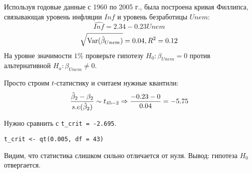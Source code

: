 \begin{problem}
Используя годовые данные с 1960 по 2005 г., была построена кривая Филлипса, связывающая уровень инфляции $Inf$ и уровень безработицы $Unem$:
\[
\widehat{Inf} = 2.34 - 0.23Unem
\]
\[
\sqrt{\operatorname{Var}(\hat{\beta}_{Unem})} = 0.04, R^2 = 0.12
\]
На уровне значимости $1\%$ проверьте гипотезу  $H_0: \beta_{Unem} = 0$ против альтернативной $H_a: \beta_{Unem} \not= 0$.


\begin{sol}
Просто строим $t$-статистику и считаем нужные квантили:
\[
\frac{\hat{\beta}_2-\beta_2}{s.e(\hat{\beta}_2)}  \sim t_{45-2} \Rightarrow \frac{-0.23 - 0}{0.04} = -5.75
\]

Нужно сравнить с \verb|t_crit = -2.695|.
\begin{verbatim}
t_crit <- qt(0.005, df = 43)
\end{verbatim}

Видим, что статистика слишком сильно отличается от нуля. Вывод: гипотеза $H_0$ отвергается.

\end{sol}
\end{problem}




